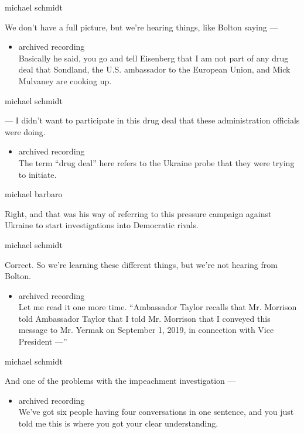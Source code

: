 michael schmidt

We don't have a full picture, but we're hearing things, like Bolton
saying ---

\begin{itemize}
\tightlist
\item
  archived recording\\
  Basically he said, you go and tell Eisenberg that I am not part of any
  drug deal that Sondland, the U.S. ambassador to the European Union,
  and Mick Mulvaney are cooking up.
\end{itemize}

michael schmidt

--- I didn't want to participate in this drug deal that these
administration officials were doing.

\begin{itemize}
\tightlist
\item
  archived recording\\
  The term ``drug deal'' here refers to the Ukraine probe that they were
  trying to initiate.
\end{itemize}

michael barbaro

Right, and that was his way of referring to this pressure campaign
against Ukraine to start investigations into Democratic rivals.

michael schmidt

Correct. So we're learning these different things, but we're not hearing
from Bolton.

\begin{itemize}
\tightlist
\item
  archived recording\\
  Let me read it one more time. ``Ambassador Taylor recalls that Mr.
  Morrison told Ambassador Taylor that I told Mr. Morrison that I
  conveyed this message to Mr. Yermak on September 1, 2019, in
  connection with Vice President ---''
\end{itemize}

michael schmidt

And one of the problems with the impeachment investigation ---

\begin{itemize}
\tightlist
\item
  archived recording\\
  We've got six people having four conversations in one sentence, and
  you just told me this is where you got your clear understanding.
\end{itemize}

